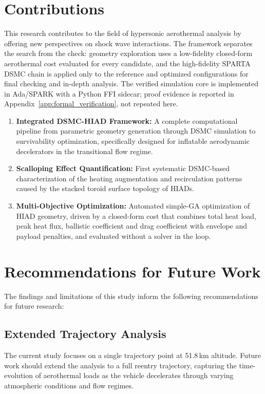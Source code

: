 \section{Contributions}
This research contributes to the field of hypersonic aerothermal analysis by offering new perspectives on shock wave interactions.
The framework separates the search from the check: geometry exploration uses a low-fidelity closed-form aerothermal cost evaluated for every candidate, and the high-fidelity SPARTA DSMC chain is applied only to the reference and optimized configurations for final checking and in-depth analysis. The verified simulation core is implemented in Ada/SPARK with a Python FFI sidecar; proof evidence is reported in Appendix~\ref{app:formal_verification}, not repeated here.
\begin{enumerate}
    \item \textbf{Integrated DSMC-HIAD Framework:} A complete computational pipeline from parametric geometry generation through DSMC simulation to survivability optimization, specifically designed for inflatable aerodynamic decelerators in the transitional flow regime.

    \item \textbf{Scalloping Effect Quantification:} First systematic DSMC-based characterization of the heating augmentation and recirculation patterns caused by the stacked toroid surface topology of HIADs.


    \item \textbf{Multi-Objective Optimization:} Automated simple-GA optimization of HIAD geometry, driven by a closed-form cost that combines total heat load, peak heat flux, ballistic coefficient and drag coefficient with envelope and payload penalties, and evaluated without a solver in the loop.
\end{enumerate}

\section{Recommendations for Future Work}
The findings and limitations of this study inform the following recommendations for future research:

\subsection{Extended Trajectory Analysis}
The current study focuses on a single trajectory point at 51.8\,km altitude. Future work should extend the analysis to a full reentry trajectory, capturing the time-evolution of aerothermal loads as the vehicle decelerates through varying atmospheric conditions and flow regimes.

